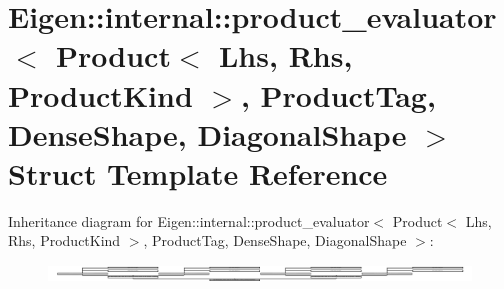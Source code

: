 \hypertarget{struct_eigen_1_1internal_1_1product__evaluator_3_01_product_3_01_lhs_00_01_rhs_00_01_product_kin7ddac0b59f4a730d2a73e162a876e10d}{}\section{Eigen\+:\+:internal\+:\+:product\+\_\+evaluator$<$ Product$<$ Lhs, Rhs, Product\+Kind $>$, Product\+Tag, Dense\+Shape, Diagonal\+Shape $>$ Struct Template Reference}
\label{struct_eigen_1_1internal_1_1product__evaluator_3_01_product_3_01_lhs_00_01_rhs_00_01_product_kin7ddac0b59f4a730d2a73e162a876e10d}
Inheritance diagram for Eigen\+:\+:internal\+:\+:product\+\_\+evaluator$<$ Product$<$ Lhs, Rhs, Product\+Kind $>$, Product\+Tag, Dense\+Shape, Diagonal\+Shape $>$\+:\begin{figure}[H]
\begin{center}
\leavevmode
\includegraphics[height=0.451031cm]{struct_eigen_1_1internal_1_1product__evaluator_3_01_product_3_01_lhs_00_01_rhs_00_01_product_kin7ddac0b59f4a730d2a73e162a876e10d}
\end{center}
\end{figure}
